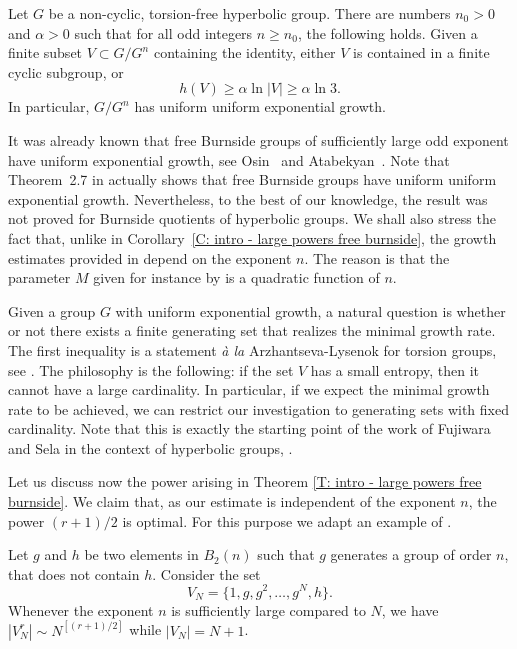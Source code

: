 \begin{cor}
\label{C: intro - large powers free burnside}
Let $G$ be a non-cyclic, torsion-free hyperbolic group.
There are numbers $n_0>0$ and $\alpha>0$ such that for all odd integers $n \geqslant n_0$, the following holds.
Given a finite subset $V \subset G/G^n$ containing the identity, either $V$ is contained in a finite cyclic subgroup, or
\[
h(V) \geq \alpha \ln |V| \geq \alpha \ln 3.
\]
In particular, $G/G^n$ has uniform uniform exponential growth.
\end{cor}

It was already known that free Burnside groups of sufficiently large odd exponent have uniform exponential growth, see Osin~\cite[Cor.\,1.4]{osin_uniform_2007} and Atabekyan~\cite[Cor.\,3]{atabekyan_uniform_2009}.
Note that Theorem~2.7 in \cite{osin_uniform_2007} actually shows that free Burnside groups have uniform uniform exponential growth.
Nevertheless, to the best of our knowledge, the result was not proved for Burnside quotients of hyperbolic groups.
We shall also stress the fact that, unlike in Corollary~\ref{C: intro - large powers free burnside}, the growth estimates provided in \cite{osin_uniform_2007, atabekyan_uniform_2009} depend on the exponent $n$.
The reason is that the parameter $M$ given for instance by \cite[Th.\,2.7]{osin_uniform_2007} is a quadratic function of $n$.

Given a group $G$ with uniform exponential growth, a natural question is whether or not there exists a finite generating set that realizes the minimal growth rate.
The first inequality is a statement \emph{à la} Arzhantseva-Lysenok for torsion groups, see \cite[Th.\,1]{arzhantseva_lower_2006}.
The philosophy is the following: if the set $V$ has a small entropy, then it cannot have a large cardinality.
In particular, if we expect the minimal growth rate to be achieved, we can restrict our investigation to generating sets with fixed cardinality.
Note that this is exactly the starting point of the work of Fujiwara and Sela in the context of hyperbolic groups, \cite{fujiwara_rates_2020}.

Let us discuss now the power arising in Theorem \ref{T: intro - large powers free burnside}.
We claim that, as our estimate is independent of the exponent $n$, the power $(r+1)/2$ is optimal.
For this purpose we adapt an example of \cite{safin_powers_2011}.

\begin{ex} \label{E: optimal}
Let $g$ and $h$ be two elements in $B_2(n)$ such that $g$ generates a group of order $n$, that does not contain $h$.
Consider the set
\begin{equation*}
V_N=\{1, g, g^2 ,\ldots , g^N, h\}.
\end{equation*}
Whenever the exponent $n$ is sufficiently large compared to $N$, we have $|V_N^r|\sim N^{[(r+1)/2]}$ while $|V_N|=N+1$.
\end{ex}

